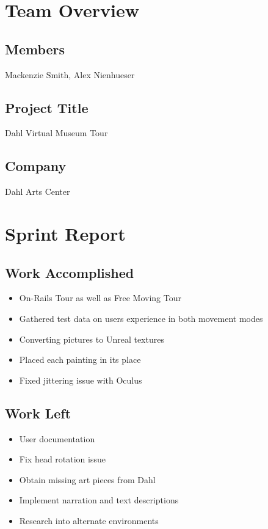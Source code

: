 \documentclass[11pt]{book}
\begin{document}

\section*{Team Overview}
\hrulefill
\subsection*{Members}
Mackenzie Smith, Alex Nienhueser

\subsection*{Project Title}
Dahl Virtual Museum Tour

\subsection*{Company}
Dahl Arts Center


\section*{Sprint Report}
\hrulefill
\subsection*{Work Accomplished}
\begin{itemize}
\item On-Rails Tour as well as Free Moving Tour
\item Gathered test data on users experience in both movement modes
\item Converting pictures to Unreal textures
\item Placed each painting in its place
\item Fixed jittering issue with Oculus

\end{itemize}
\subsection*{Work Left}
\begin{itemize}
\item User documentation
\item Fix head rotation issue
\item Obtain missing art pieces from Dahl
\item Implement narration and text descriptions
\item Research into alternate environments
\end{itemize}
\end{document}
